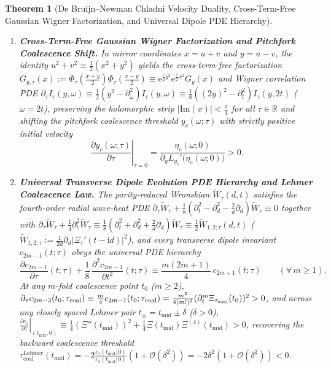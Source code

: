 \documentclass[11pt,reqno]{amsart}
\newtheorem{theorem}{Theorem}[section]
\theoremstyle{definition}
\theoremstyle{remark}
\numberwithin{equation}{section}
\newcommand{\R}{\mathbb{R}}
\newcommand{\ee}{\mathrm{e}}
\newcommand{\ii}{\mathrm{i}}
\newcommand{\Ima}{\mathrm{Im}}
\newcommand{\fac}{\mathclose{\mathchar"0021}}
\begin{document}
\begin{theorem}[De Bruijn--Newman Chladni Velocity Duality, Cross-Term-Free Gaussian Wigner Factorization, and Universal Dipole PDE Hierarchy]
\begin{enumerate}[label=\textup{(\roman*)},leftmargin=2.2em]
\begin{equation}
\end{equation}
\item \textbf{Cross-Term-Free Gaussian Wigner Factorization and Pitchfork Coalescence Shift.} In mirror coordinates $x = u+v$ and $y = u-v$, the identity $u^2+v^2 \equiv \frac{1}{2}(x^2+y^2)$ yields the cross-term-free factorization $G_{y,\tau}(x) := \Phi_\tau(\frac{x+y}{2})\Phi_\tau(\frac{x-y}{2}) \equiv \ee^{\frac{\tau}{2}y^2}\ee^{\frac{\tau}{2}x^2}G_y(x)$ and Wigner correlation PDE $\partial_\tau I_\tau(y,\omega) \equiv \frac{1}{2}(y^2 - \partial_\omega^2)I_\tau(y,\omega) \equiv \frac{1}{8}((2y)^2 - \partial_t^2)I_\tau(y,2t)$ ($\omega = 2t$), preserving the holomorphic strip $|\Ima(x)| < \frac{\pi}{4}$ for all $\tau \in \R$ and shifting the pitchfork coalescence threshold $y_c(\omega;\tau)$ with strictly positive initial velocity
\begin{equation}\label{eq:intro_yc_shift}
\left.\frac{\partial y_c(\omega;\tau)}{\partial\tau}\right|_{\tau=0} = \frac{\eta_c(\omega;0)}{\partial_y L_{y_c}'\bigl(\eta_c(\omega;0)\bigr)} > 0.
\end{equation}
\item \textbf{Universal Transverse Dipole Evolution PDE Hierarchy and Lehmer Coalescence Law.} The parity-reduced Wronskian $\widetilde{W}_\tau(d,t)$ satisfies the fourth-order radial wave-heat PDE $\partial_\tau\widetilde{W}_\tau + \frac{1}{8}(\partial_t^2 - \partial_d^2 - \frac{2}{d}\partial_d)\widetilde{W}_\tau \equiv 0$ together with $\partial_\tau\widetilde{W}_\tau + \frac{1}{4}\partial_t^2\widetilde{W}_\tau \equiv \frac{1}{8}(\partial_t^2 + \partial_d^2 + \frac{2}{d}\partial_d)\widetilde{W}_\tau \equiv \frac{1}{2}\widetilde{W}_{1,2;\tau}(d,t)$ ($\widetilde{W}_{1,2;\tau} := \frac{1}{2d}\partial_d|\Xi_\tau'(t-\ii d)|^2$), and every transverse dipole invariant $c_{2m-1}(t;\tau)$ obeys the universal PDE hierarchy
\begin{equation}\label{eq:intro_dipole_pde}
\frac{\partial c_{2m-1}}{\partial\tau}(t;\tau) + \frac{1}{8}\,\frac{\partial^2 c_{2m-1}}{\partial t^2}(t;\tau) \equiv \frac{m(2m+1)}{4}\,c_{2m+1}(t;\tau) \qquad (\forall\, m \ge 1).
\end{equation}
At any $m$-fold coalescence point $t_0$ ($m \ge 2$), $\partial_\tau c_{2m-3}(t_0;\tau_{\mathrm{coal}}) \equiv \frac{m}{4}c_{2m-1}(t_0;\tau_{\mathrm{coal}}) = \frac{m^2}{4(m\fac)^2}(\partial_t^m\Xi_{\tau_{\mathrm{coal}}}(t_0))^2 > 0$, and across any closely spaced Lehmer pair $t_\pm = t_{\mathrm{mid}} \pm \delta$ ($\delta > 0$), $\left.\frac{\partial c_1}{\partial\tau}\right|_{(t_{\mathrm{mid}},0)} \equiv \frac{1}{4}(\Xi''(t_{\mathrm{mid}}))^2 + \frac{1}{4}\Xi(t_{\mathrm{mid}})\Xi^{(4)}(t_{\mathrm{mid}}) > 0$, recovering the backward coalescence threshold $\tau_{\mathrm{coal}}^{\mathrm{Lehmer}}(t_{\mathrm{mid}}) = -2\frac{c_1(t_{\mathrm{mid}};0)}{c_3(t_{\mathrm{mid}};0)}(1 + \mathcal{O}(\delta^2)) = -2\delta^2(1 + \mathcal{O}(\delta^2)) < 0$.
\end{enumerate}
\end{theorem}
\end{document}
